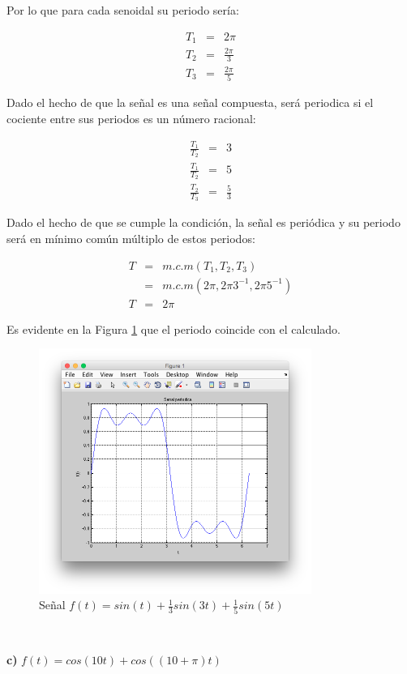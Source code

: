 \documentclass[twocolumn]{article}
\begin{document}
Por lo que para cada senoidal su periodo sería:

\begin{eqnarray*}
T_1 &=& 2\pi\\
T_2 &=& \frac{2\pi}{3}\\
T_3 &=& \frac{2\pi}{5}
\end{eqnarray*}

Dado el hecho de que la señal es una señal compuesta, será periodica si el cociente entre sus periodos es un número racional:

\begin{eqnarray*}
\frac{T_1}{T_2} &=& 3\\
\frac{T_1}{T_2} &=& 5\\
\frac{T_2}{T_3} &=& \frac{5}{3}
\end{eqnarray*}

Dado el hecho de que se cumple la condición, la señal es periódica y su periodo será en mínimo común múltiplo de estos periodos:

\begin{eqnarray*}
T &=& m.c.m(T_1,T_2,T_3)\\
&=& m.c.m(2 \pi,2\pi3^{-1},2\pi5^{-1})\\
T &=& 2\pi
\end{eqnarray*}

Es evidente en la Figura \ref{fig_5b} que el periodo coincide con el calculado.

\begin{figure}[!t]
\centering
\includegraphics[width=3.5in]{imgs/5b.png}
\caption{Señal $f(t) = sin(t) + \frac{1}{3}sin(3t) + \frac{1}{5}sin(5t)$}
\label{fig_5b}
\end{figure}

$\,$

\textbf{c)} $f(t) = cos(10t) + cos((10+\pi)t)$
\end{document}
